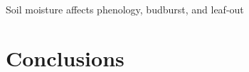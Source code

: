\documentclass{article}
\begin{document}

\par  Soil moisture affects phenology, budburst, and  leaf-out

\section* {Conclusions}
\end{document}
